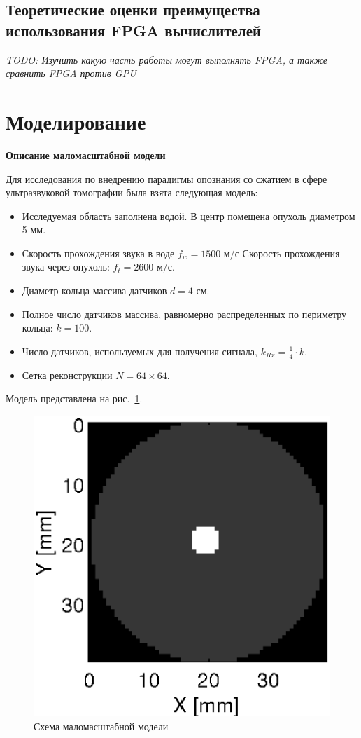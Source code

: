 \documentclass[14pt]{matmex-diploma}
\begin{document}
\subsection{Теоретические оценки преимущества использования FPGA вычислителей}
\textit{TODO: Изучить какую часть работы могут выполнять FPGA, а также сравнить FPGA против GPU} \\


\section{Моделирование} \label{sec:modeling}

\textbf{Описание маломасштабной модели} \label{sec:model_desc}

Для исследования по внедрению парадигмы опознания со сжатием в сфере ультразвуковой томографии была взята следующая модель:
\begin{itemize}
\item Исследуемая область заполнена водой. В центр помещена опухоль диаметром 5 мм.
\item Скорость прохождения звука в воде $f_w = 1500$ м/с Скорость прохождения звука через опухоль: $f_t = 2600$ м/с.
\item Диаметр кольца массива датчиков $d = 4 $ см.
\item Полное число датчиков массива, равномерно распределенных по периметру кольца: $k = 100$.
\item Число датчиков, используемых для получения сигнала, $k_{Rx} = \frac{1}{4} \cdot k$.
\item Сетка реконструкции $N = 64\times 64$.
\end{itemize}
Модель представлена на рис.~\ref{fig:model_1}.

\begin{figure}[h]
\centering
    \includegraphics[width=.4\textwidth]{pics_eps/model.eps}
    \caption{\small Схема маломасштабной модели}
    \label{fig:model_1}
\end{figure}
\end{document}
